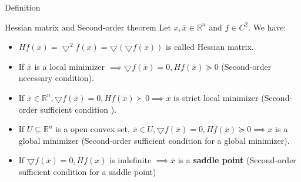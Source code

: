     \begin{frame}{Definition}
        \begin{block}{Hessian matrix and Second-order theorem}
        Let $x, \overline{x} \in \mathbb{R}^n$ and $f \in C^2$. We have:
        \begin{itemize}
            \item $Hf(x) = \bigtriangledown^2f(x) = \bigtriangledown (\bigtriangledown f(x))$ is called Hessian matrix.
            \item If $\overline{x}$ is a local minimizer $\implies \bigtriangledown f(\overline{x}) = 0, Hf(\overline{x}) \succeq 0$ (Second-order necessary condition).
            \item If $\overline{x} \in \mathbb{R}^n, \bigtriangledown f(\overline{x}) = 0, Hf(\overline{x}) \succ 0 \implies \overline{x}$ is strict local minimizer (Second-order sufficient condition ).
            \item  If $U \subseteq \mathbb{R}^n $ is a open convex set, $\overline{x} \in U, \bigtriangledown f(\overline{x}) = 0, Hf(\overline{x}) \succeq 0 \implies x$ is a global minimizer (Second-order sufficient condition for a global minimizer).
            \item  If $\bigtriangledown f(\overline{x}) = 0, Hf(x)$ is indefinite $\implies \overline{x}$ is a \textbf{saddle point} (Second-order sufficient condition for a saddle point)
        \end{itemize}
        \end{block}
    \end{frame}

